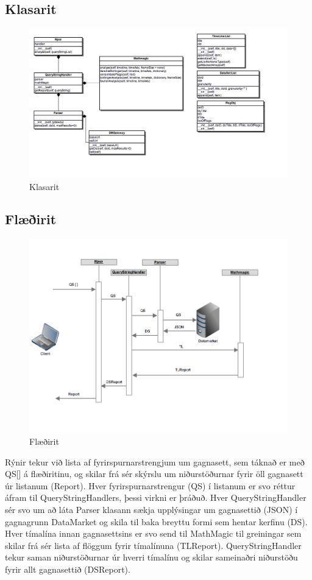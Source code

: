 \documentclass{article}
\begin{document}
\subsection{Klasarit}
\label{sec:class_diagram}

\begin{figure}[H]
  \centering
  \includegraphics[width=.75\textwidth]{rynir_class_diagram.png} 
  \caption{Klasarit} 
\end{figure}


\subsection{Flæðirit}
\label{sec:flow_chart}

\begin{figure}[H]
  \centering
  \includegraphics[width=.75\textwidth]{rynir_sequence-2.png} 
  \caption{Flæðirit} 
\end{figure}

Rýnir tekur við lista af fyrirspurnarstrengjum um gagnasett, sem táknað er með
QS[] á flæðiritinu, og skilar frá sér skýrslu um niðurstöðurnar fyrir öll
gagnasett úr listanum (Report). Hver fyrirspurnarstrengur (QS) í listanum er svo
réttur áfram til QueryStringHandlers, þessi virkni er þráðuð. Hver
QueryStringHandler sér svo um að láta Parser klasann sækja upplýsingar um
gagnasettið (JSON) í gagnagrunn DataMarket og skila til baka breyttu formi sem
hentar kerfinu (DS). Hver tímalína innan gagnasettsins er svo send til MathMagic
til greiningar sem skilar frá sér lista af flöggum fyrir tímalínuna (TLReport).
QueryStringHandler tekur saman niðurstöðurnar úr hverri tímalínu og skilar
sameinaðri niðurstöðu fyrir allt gagnasettið (DSReport).
\end{document}
